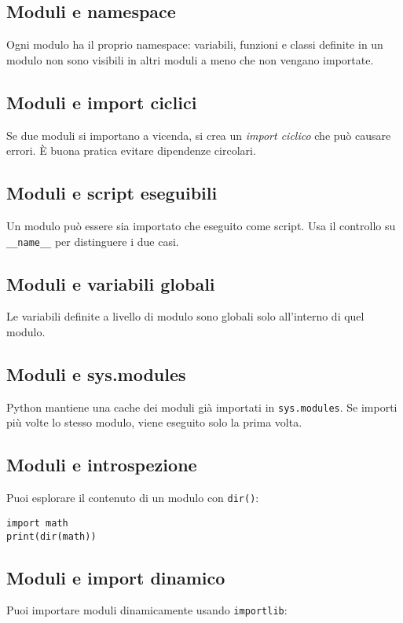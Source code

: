 \documentclass[a4paper,12pt]{article}
\begin{document}
\subsection*{Moduli e namespace}
Ogni modulo ha il proprio namespace: variabili, funzioni e classi definite in un modulo non sono visibili in altri moduli a meno che non vengano importate.

\subsection*{Moduli e import ciclici}
Se due moduli si importano a vicenda, si crea un \textit{import ciclico} che può causare errori. È buona pratica evitare dipendenze circolari.

\subsection*{Moduli e script eseguibili}
Un modulo può essere sia importato che eseguito come script. Usa il controllo su \texttt{\_\_name\_\_} per distinguere i due casi.

\subsection*{Moduli e variabili globali}
Le variabili definite a livello di modulo sono globali solo all'interno di quel modulo.

\subsection*{Moduli e sys.modules}
Python mantiene una cache dei moduli già importati in \texttt{sys.modules}. Se importi più volte lo stesso modulo, viene eseguito solo la prima volta.

\subsection*{Moduli e introspezione}
Puoi esplorare il contenuto di un modulo con \texttt{dir()}:

\begin{lstlisting}
import math
print(dir(math))
\end{lstlisting}

\subsection*{Moduli e import dinamico}
Puoi importare moduli dinamicamente usando \texttt{importlib}:
\end{document}
